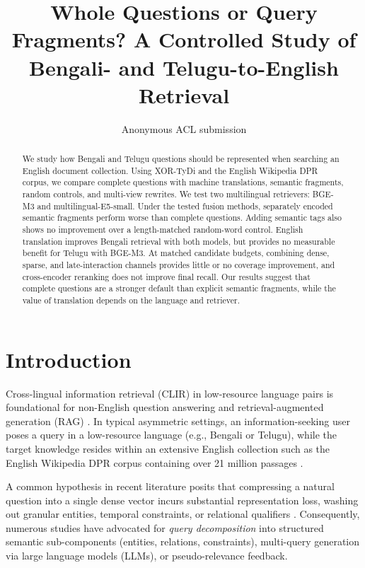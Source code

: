 \documentclass[11pt]{article}
\title{Whole Questions or Query Fragments? A Controlled Study of Bengali- and Telugu-to-English Retrieval}
\author{Anonymous ACL submission}
\begin{document}
\maketitle

\begin{abstract}
We study how Bengali and Telugu questions should be represented when searching an English document collection. Using XOR-TyDi and the English Wikipedia DPR corpus, we compare complete questions with machine translations, semantic fragments, random controls, and multi-view rewrites. We test two multilingual retrievers: BGE-M3 and multilingual-E5-small. Under the tested fusion methods, separately encoded semantic fragments perform worse than complete questions. Adding semantic tags also shows no improvement over a length-matched random-word control. English translation improves Bengali retrieval with both models, but provides no measurable benefit for Telugu with BGE-M3. At matched candidate budgets, combining dense, sparse, and late-interaction channels provides little or no coverage improvement, and cross-encoder reranking does not improve final recall. Our results suggest that complete questions are a stronger default than explicit semantic fragments, while the value of translation depends on the language and retriever.
\end{abstract}

\section{Introduction}
\label{sec:intro}

Cross-lingual information retrieval (CLIR) in low-resource language pairs is foundational for non-English question answering and retrieval-augmented generation (RAG) \citep{asai2021xor}. In typical asymmetric settings, an information-seeking user poses a query in a low-resource language (e.g., Bengali or Telugu), while the target knowledge resides within an extensive English collection such as the English Wikipedia DPR corpus containing over 21 million passages \citep{karpukhin2020dense}.

A common hypothesis in recent literature posits that compressing a natural question into a single dense vector incurs substantial representation loss, washing out granular entities, temporal constraints, or relational qualifiers \citep{weller2024when}. Consequently, numerous studies have advocated for \emph{query decomposition} into structured semantic sub-components (entities, relations, constraints), multi-query generation via large language models (LLMs), or pseudo-relevance feedback.
\end{document}
